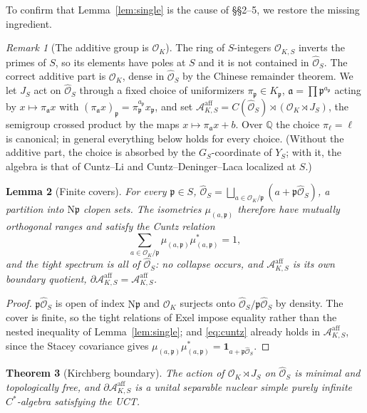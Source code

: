 \documentclass[11pt]{amsart}
\numberwithin{equation}{section}
\newtheorem{theorem}{Theorem}[section]
\newtheorem{lemma}[theorem]{Lemma}
\theoremstyle{definition}
\theoremstyle{remark}
\newtheorem{remark}[theorem]{Remark}
\newcommand{\Q}{\mathbb{Q}}
\newcommand{\cA}{\mathcal{A}}
\newcommand{\cO}{\mathcal{O}}
\newcommand{\hO}{\widehat{\cO}}
\newcommand{\pp}{\mathfrak{p}}
\newcommand{\aaa}{\mathfrak{a}}
\newcommand{\Ns}{\mathrm{N}}
\begin{document}
To confirm that Lemma~\ref{lem:single} is the cause of \S\S2--5, we restore the missing
ingredient.

\begin{remark}[The additive group is $\cO_K$]\label{rem:additive}
The ring of $S$-integers $\cO_{K,S}$ inverts the primes of $S$, so its elements have poles
at $S$ and it is not contained in $\hO_S$. The correct additive part is $\cO_K$, dense in
$\hO_S$ by the Chinese remainder theorem. We let $J_S$ act on $\hO_S$ through a fixed choice
of uniformizers $\pi_\pp\in K_\pp$, $\aaa=\prod\pp^{a_\pp}$ acting by
$x\mapsto\pi_\aaa x$ with $(\pi_\aaa x)_\pp=\pi_\pp^{a_\pp}x_\pp$, and set
$\cA^{\mathrm{aff}}_{K,S}=C(\hO_S)\rtimes(\cO_K\rtimes J_S)$, the semigroup crossed product
by the maps $x\mapsto\pi_\aaa x+b$. Over $\Q$ the choice $\pi_\ell=\ell$ is canonical; in
general everything below holds for every choice. (Without the additive part, the choice is
absorbed by the $G_S$-coordinate of $Y_S$; with it, the algebra is that of Cuntz--Li
\cite{CL} and Cuntz--Deninger--Laca \cite{CDL} localized at $S$.)
\end{remark}

\begin{lemma}[Finite covers]\label{lem:cover}
For every $\pp\in S$, $\hO_S=\bigsqcup_{a\in\cO_K/\pp}(a+\pp\hO_S)$, a partition into
$\Ns\pp$ clopen sets. The isometries $\mu_{(a,\pp)}$ therefore have mutually orthogonal
ranges and satisfy the Cuntz relation
\begin{equation}\label{eq:cuntz}
\sum_{a\in\cO_K/\pp}\mu_{(a,\pp)}\mu_{(a,\pp)}^*=1 ,
\end{equation}
and the tight spectrum is all of $\hO_S$: no collapse occurs, and
$\cA^{\mathrm{aff}}_{K,S}$ is its own boundary quotient, $\partial\cA^{\mathrm{aff}}_{K,S}=\cA^{\mathrm{aff}}_{K,S}$.
\end{lemma}

\begin{proof}
$\pp\hO_S$ is open of index $\Ns\pp$ and $\cO_K$ surjects onto $\hO_S/\pp\hO_S$ by density.
The cover is finite, so the tight relations of Exel \cite{Exel} impose equality rather
than the nested inequality of Lemma~\ref{lem:single}; and \eqref{eq:cuntz} already holds in
$\cA^{\mathrm{aff}}_{K,S}$, since the Stacey covariance gives
$\mu_{(a,\pp)}\mu_{(a,\pp)}^*=\mathbf 1_{a+\pp\hO_S}$.
\end{proof}

\begin{theorem}[Kirchberg boundary]\label{thm:kirchberg}
The action of $\cO_K\rtimes J_S$ on $\hO_S$ is minimal and topologically free, and
$\partial\cA^{\mathrm{aff}}_{K,S}$ is a unital separable nuclear simple purely infinite
$C^*$-algebra satisfying the UCT.
\end{theorem}
\end{document}
